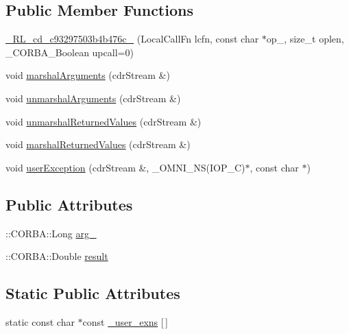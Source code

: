 \subsection*{Public Member Functions}
\begin{DoxyCompactItemize}
\item 
\hyperlink{class__0_r_l__cd__c93297503b4b476c__00000000_a39fa42d3fde3b25c87627f66cae0ea88}{\+\_\+R\+L\+\_\+cd\+\_\+c93297503b4b476c\+\_} (Local\+Call\+Fn lcfn, const char $\ast$op\+\_\+, size\+\_\+t oplen, \+\_\+\+C\+O\+R\+B\+A\+\_\+\+Boolean upcall=0)
\item 
void \hyperlink{class__0_r_l__cd__c93297503b4b476c__00000000_a30a9ce428cfc2b4e1bed20f2aea500d5}{marshal\+Arguments} (cdr\+Stream \&)
\item 
void \hyperlink{class__0_r_l__cd__c93297503b4b476c__00000000_a62c797ae6a2627ed0b0ec4c8775ef15b}{unmarshal\+Arguments} (cdr\+Stream \&)
\item 
void \hyperlink{class__0_r_l__cd__c93297503b4b476c__00000000_a8f8e55e3b23e45bd169848018d148c2e}{unmarshal\+Returned\+Values} (cdr\+Stream \&)
\item 
void \hyperlink{class__0_r_l__cd__c93297503b4b476c__00000000_ad3be4ef51381ee2c0069772e59b2f99a}{marshal\+Returned\+Values} (cdr\+Stream \&)
\item 
void \hyperlink{class__0_r_l__cd__c93297503b4b476c__00000000_a3b5d41f45aa39c10bcce7877f5b45e8b}{user\+Exception} (cdr\+Stream \&, \+\_\+\+O\+M\+N\+I\+\_\+\+NS(I\+O\+P\+\_\+C)$\ast$, const char $\ast$)
\end{DoxyCompactItemize}
\subsection*{Public Attributes}
\begin{DoxyCompactItemize}
\item 
\+::C\+O\+R\+B\+A\+::\+Long \hyperlink{class__0_r_l__cd__c93297503b4b476c__00000000_a9d70bde12d4e7bf6319ad0d2bd20a813}{arg\+\_}
\item 
\+::C\+O\+R\+B\+A\+::\+Double \hyperlink{class__0_r_l__cd__c93297503b4b476c__00000000_a1f600d809c6391de305682594e9b03f7}{result}
\end{DoxyCompactItemize}
\subsection*{Static Public Attributes}
\begin{DoxyCompactItemize}
\item 
static const char $\ast$const \hyperlink{class__0_r_l__cd__c93297503b4b476c__00000000_aed815b8e10305526569276393b2f0675}{\+\_\+user\+\_\+exns} \mbox{[}$\,$\mbox{]}
\end{DoxyCompactItemize}


